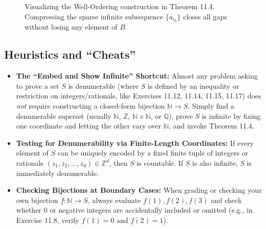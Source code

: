 \documentclass[11pt, letterpaper]{article}
\theoremstyle{definition}
\theoremstyle{remark}
\begin{document}
\begin{figure}[htbp]
\caption{Visualizing the Well-Ordering construction in Theorem 11.4. Compressing the sparse infinite subsequence $\{a_{i_k}\}$ closes all gaps without losing any element of $B$.}
\label{fig:well_ordering_extraction}
\end{figure}

\subsection{Heuristics and ``Cheats''}

\begin{itemize}
    \item \textbf{The ``Embed and Show Infinite'' Shortcut:} Almost any problem asking to prove a set $S$ is denumerable (where $S$ is defined by an inequality or restriction on integers/rationals, like Exercises 11.12, 11.14, 11.15, 11.17) does \textit{not} require constructing a closed-form bijection $\mathbb{N} \to S$. Simply find a denumerable superset (usually $\mathbb{N}$, $\mathbb{Z}$, $\mathbb{N} \times \mathbb{N}$, or $\mathbb{Q}$), prove $S$ is infinite by fixing one coordinate and letting the other vary over $\mathbb{N}$, and invoke Theorem 11.4.
    \item \textbf{Testing for Denumerability via Finite-Length Coordinates:} If every element of $S$ can be uniquely encoded by a fixed finite tuple of integers or rationals $(z_1, z_2, \dots, z_d) \in \mathbb{Z}^d$, then $S$ is countable. If $S$ is also infinite, $S$ is immediately denumerable.
    \item \textbf{Checking Bijections at Boundary Cases:} When grading or checking your own bijection $f : \mathbb{N} \to S$, always evaluate $f(1), f(2), f(3)$ and check whether $0$ or negative integers are accidentally included or omitted (e.g., in Exercise 11.8, verify $f(1) = 0$ and $f(2) = 1$).
\end{itemize}
\end{document}
